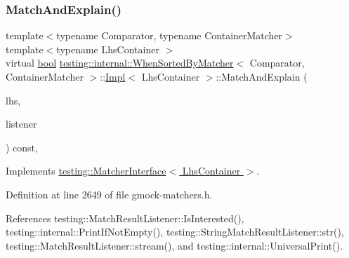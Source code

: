 \mbox{\label{classtesting_1_1internal_1_1WhenSortedByMatcher_1_1Impl_a9d8f57c729df8c041f2fd7febbc950da}} 
\subsubsection{\texorpdfstring{Match\+And\+Explain()}{MatchAndExplain()}}
{\footnotesize\ttfamily template$<$typename Comparator, typename Container\+Matcher$>$ \\
template$<$typename Lhs\+Container $>$ \\
virtual \hyperlink{classbool}{bool} \hyperlink{classtesting_1_1internal_1_1WhenSortedByMatcher}{testing\+::internal\+::\+When\+Sorted\+By\+Matcher}$<$ Comparator, Container\+Matcher $>$\+::\hyperlink{classtesting_1_1internal_1_1WhenSortedByMatcher_1_1Impl}{Impl}$<$ Lhs\+Container $>$\+::Match\+And\+Explain (\begin{DoxyParamCaption}\item[{Lhs\+Container}]{lhs,  }\item[{\hyperlink{classtesting_1_1MatchResultListener}{Match\+Result\+Listener} $\ast$}]{listener }\end{DoxyParamCaption}) const\hspace{0.3cm}{\ttfamily [inline]}, {\ttfamily [virtual]}}



Implements \hyperlink{classtesting_1_1MatcherInterface_a296b43607cd99d60365f0e6a762777cf}{testing\+::\+Matcher\+Interface$<$ Lhs\+Container $>$}.



Definition at line 2649 of file gmock-\/matchers.\+h.



References testing\+::\+Match\+Result\+Listener\+::\+Is\+Interested(), testing\+::internal\+::\+Print\+If\+Not\+Empty(), testing\+::\+String\+Match\+Result\+Listener\+::str(), testing\+::\+Match\+Result\+Listener\+::stream(), and testing\+::internal\+::\+Universal\+Print().


